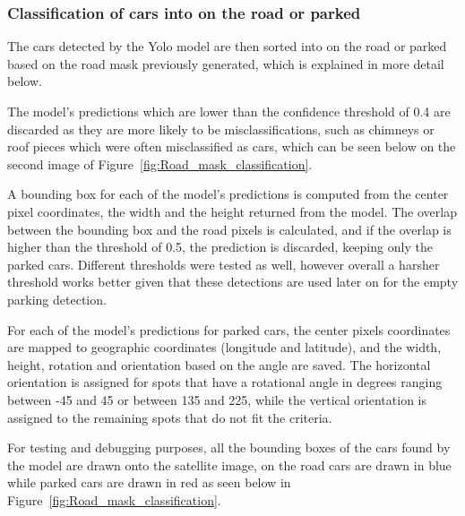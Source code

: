 \newpage{}

\subsubsection{Classification of cars into on the road or parked}
The cars detected by the Yolo model are then sorted into on the road or parked based on the road mask previously generated, which is explained in more detail below.

The model's predictions which are lower than the confidence threshold of 0.4 are discarded as they are more likely to be misclassifications, such as chimneys or roof pieces which were often misclassified as cars, which can be seen below on the second image of Figure~\ref{fig:Road_mask_classification}.

A bounding box for each of the model's predictions is computed from the center pixel coordinates, the width and the height returned from the model.
The overlap between the bounding box and the road pixels is calculated, and if the overlap is higher than the threshold of 0.5, the prediction is discarded, keeping only the parked cars.
Different thresholds were tested as well, however overall a harsher threshold works better given that these detections are used later on for the empty parking detection.

For each of the model's predictions for parked cars, the center pixels coordinates are mapped to geographic coordinates (longitude and latitude), and the width, height, rotation and orientation based on the angle are saved. The horizontal orientation is assigned for spots that have a rotational angle in degrees ranging between -45 and 45 or between 135 and 225, while the vertical orientation is assigned to the remaining spots that do not fit the criteria.

For testing and debugging purposes, all the bounding boxes of the cars found by
the model are drawn onto the satellite image, on the road cars are drawn in blue
while parked cars are drawn in red as seen below in
Figure~\ref{fig:Road_mask_classification}.

